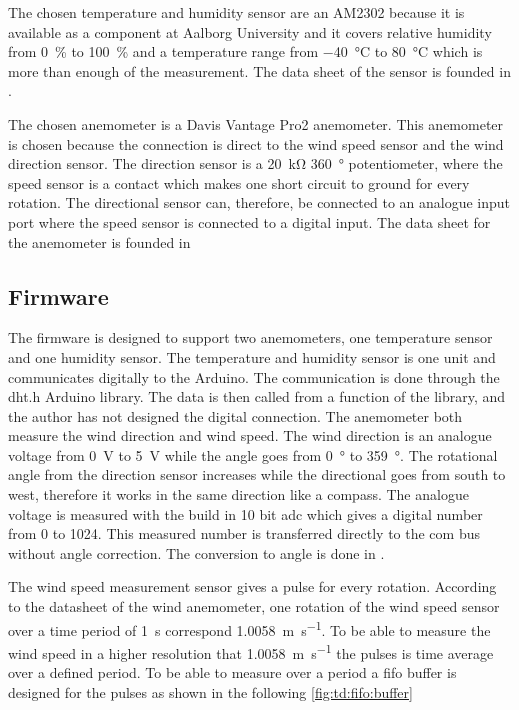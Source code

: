 The chosen temperature and humidity sensor are an AM2302 because it is available as a component at Aalborg University and it covers relative humidity from \SI{0}{\percent} to \SI{100}{\percent} and a temperature range from \SI{-40}{\celsius} to \SI{80}{\celsius} which is more than enough of the measurement. The data sheet of the sensor is founded in \citep{temp_sens}.


The chosen anemometer is a Davis Vantage Pro2 anemometer. This anemometer is chosen because the connection is direct to the wind speed sensor and the wind direction sensor. The direction sensor is a \SI{20}{\kilo\ohm} \SI{360}{\degree} potentiometer, where the speed sensor is a contact which makes one short circuit to ground for every rotation. The directional sensor can, therefore, be connected to an analogue input port where the speed sensor is connected to a digital input. The data sheet for the anemometer is founded in \citep{anemometer_sens}



\subsection{Firmware}
The firmware is designed to support two anemometers, one temperature sensor and one humidity sensor.
The temperature and humidity sensor is one unit and communicates digitally to the Arduino. The communication is done through the dht.h Arduino library. The data is then called from a function of the library, and the author has not designed the digital connection. 
The anemometer both measure the wind direction and wind speed. The wind direction is an analogue voltage from \SI{0}{\volt} to \SI{5}{\volt} while the angle goes from \SI{0}{\degree} to \SI{359}{\degree}. The rotational angle from the direction sensor increases while the directional goes from south to west, therefore it works in the same direction like a compass. The analogue voltage is measured with the build in 10 bit \gls{adc} which gives a digital number from 0 to 1024. This measured number is transferred directly to the com bus without angle correction. The conversion to angle is done in \matlab . 

The wind speed measurement sensor gives a pulse for every rotation. According to the datasheet of the wind anemometer, one rotation of the wind speed sensor over a time period of \SI{1}{\second} correspond \SI{1.0058}{\meter\per\second}. To be able to measure the wind speed in a higher resolution that \SI{1.0058}{\meter\per\second} the pulses is time average over a defined period. To be able to measure over a period a \gls{fifo} buffer is designed for the pulses as shown in the following \autoref{fig:td:fifo:buffer} 

